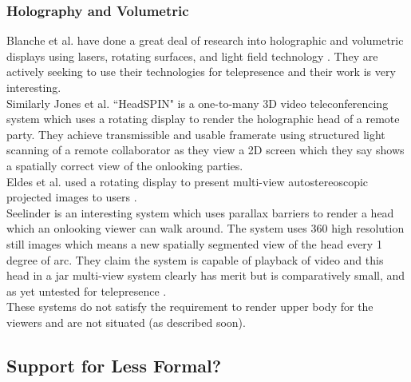 \subsubsection{Holography and Volumetric}
Blanche et al. have done a great deal of research into holographic and volumetric displays using lasers, rotating surfaces, and light field technology   \cite{Blanche2010,tay2008updatable}. They are actively seeking to use their technologies for telepresence and their work is very interesting.\\
Similarly Jones et al. ``HeadSPIN" is a one-to-many 3D video teleconferencing system \cite{jones2009} which uses a rotating display to render the holographic head of a remote party. They achieve transmissible and usable framerate using structured light scanning of a remote collaborator as they view a 2D screen which they say shows a spatially correct view of the onlooking parties.\\
Eldes et al. used a rotating display to present multi-view autostereoscopic projected images to users \cite{eldes2013multi}.\\
Seelinder is an interesting system which uses parallax barriers to render a head which an onlooking viewer can walk around. The system uses 360 high resolution still images which means a new spatially segmented view of the head every 1 degree of arc. They claim the system is capable of playback of video and this head in a jar multi-view system clearly has merit but is comparatively small, and as yet untested for telepresence \cite{Yendo2010}.\\
These systems do not satisfy the requirement to render upper body for the viewers and are not situated (as described soon).\\

        \subsection{Support for Less Formal?}
        

